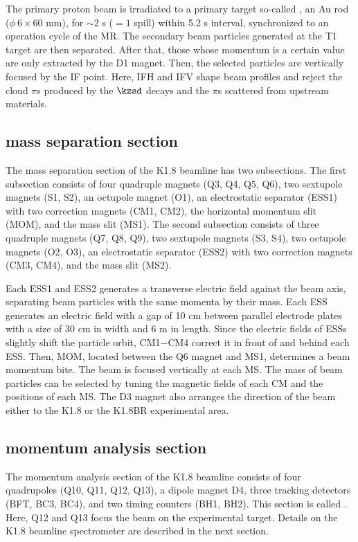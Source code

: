 The primary proton beam is irradiated to a primary target so-called , an Au rod ($\phi\ 6\times60$ mm), for $\sim2$ s ($=1$ spill) within 5.2 s interval, synchronized to an operation cycle of the MR. The secondary beam particles generated at the T1 target are then separated. After that, those whose momentum is a certain value are only extracted by the D1 magnet. Then, the selected particles are vertically focused by the IF point. Here, IFH and IFV shape beam profiles and reject the cloud $\pi$s produced by the $\kzsd$ decays and the $\pi$s scattered from upstream materials.

\subsection{mass separation section}
The mass separation section of the K1.8 beamline has two subsections. The first subsection consists of four quadruple magnets (Q3, Q4, Q5, Q6), two sextupole magnets (S1, S2), an octupole magnet (O1), an electrostatic separator (ESS1) with two correction magnets (CM1, CM2), the horizontal momentum slit (MOM), and the mass slit (MS1). The second subsection consists of three quadruple magnets (Q7, Q8, Q9), two sextupole magnets (S3, S4), two octupole magnets (O2, O3), an electrostatic separator (ESS2) with two correction magnets (CM3, CM4), and the mass slit (MS2). 

Each ESS1 and ESS2 generates a transverse electric field against the beam axis, separating beam particles with the same momenta by their mass. Each ESS generates an electric field with a gap of 10 cm between parallel electrode plates with a size of 30 cm in width and 6 m in length. Since the electric fields of ESSs slightly shift the particle orbit, CM1$-$CM4 correct it in front of and behind each ESS. Then, MOM, located between the Q6 magnet and MS1, determines a beam momentum bite. The beam is focused vertically at each MS. The mass of beam particles can be selected by tuning the magnetic fields of each CM and the positions of each MS. The D3 magnet also arranges the direction of the beam either to the K1.8 or the K1.8BR experimental area. 

\subsection{momentum analysis section}
The momentum analysis section of the K1.8 beamline consists of four quadrupoles (Q10, Q11, Q12, Q13), a dipole magnet D4, three tracking detectors (BFT, BC3, BC4), and two timing counters (BH1, BH2). This section is called . Here, Q12 and Q13 focus the beam on the experimental target. Details on the K1.8 beamline spectrometer are described in the next section.



